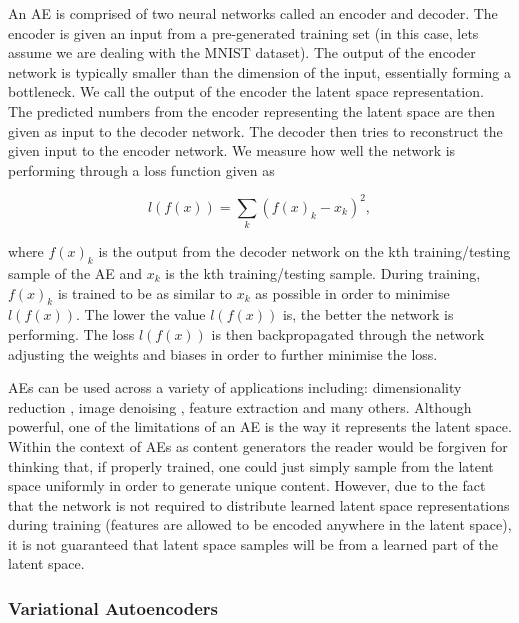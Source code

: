 An \ac{AE} is 
comprised of two neural networks called an 
encoder and decoder. The encoder is given an input 
from a pre-generated training set (in this case, lets assume 
we are dealing with the MNIST dataset). The output of the 
encoder network is typically smaller than the dimension of 
the input, essentially forming a bottleneck. 
We call the output of the encoder the latent space representation. 
The predicted numbers from the encoder representing the latent 
space are then given as input to the decoder network. The 
decoder then tries to reconstruct the given input to the 
encoder network. We measure how well the network is performing 
through a loss function given as 

\begin{equation}
    l(f(x)) = \sum_k{(f(x)_k - x_k)^2},
\end{equation}

where $f(x)_k$ is the output from the decoder network on the 
kth training/testing sample of the \ac{AE} and $x_k$ is the 
kth training/testing sample. During training, $f(x)_k$ is trained 
to be as similar to $x_k$ as possible in order to minimise 
$l(f(x))$. The lower the value $l(f(x))$ is, the better the network 
is performing. The loss $l(f(x))$ is then backpropagated through 
the network adjusting the weights and biases in order to  
further minimise the loss.

\ac{AE}s can be used across a variety of applications including: 
dimensionality reduction \cite{6910027}, image denoising \cite{NISHIO2017e00393},
feature extraction \cite{7965877} and many others. Although powerful, 
one of the limitations of an \ac{AE} is the way it represents the 
latent space. Within the context of \ac{AE}s as content generators 
the reader would be forgiven for thinking that, if properly trained, 
one could just simply sample from the latent space uniformly 
in order to generate unique content. However, due to the fact 
that the network is not required to distribute learned latent 
space representations during training (features are allowed 
to be encoded anywhere in the latent space), it is not 
guaranteed that latent space samples will be from a 
learned part of the latent space.

%
%
\subsubsection{Variational Autoencoders}

